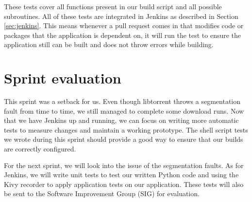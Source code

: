 		These tests cover all functions present in our build script and all possible subroutines. All of these tests are integrated in Jenkins as described in Section \ref{sec:jenkins}. This means whenever a pull request comes in that modifies code or packages that the application is dependent on, it will run the test to ensure the application still can be built and does not throw errors while building.

	\section{Sprint evaluation}
		This sprint was a setback for us. Even though libtorrent throws a segmentation fault from time to time, we still managed to complete some download runs. Now that we have Jenkins up and running, we can focus on writing more automatic tests to measure changes and maintain a working prototype. The shell script tests we wrote during this sprint should provide a good way to ensure that our builds are correctly configured.
		
		For the next sprint, we will look into the issue of the segmentation faults. As for Jenkins, we will write unit tests to test our written Python code and using the Kivy recorder to apply application tests on our application. These tests will also be sent to the Software Improvement Group (SIG) for evaluation.
